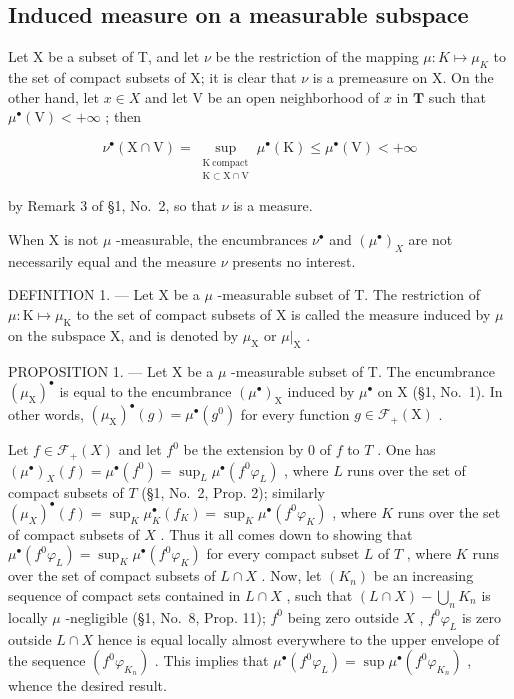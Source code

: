 \subsection{Induced measure on a measurable subspace}

Let X be a subset of T, and let \(\nu\) be the restriction of the mapping \(\mu: K \mapsto \mu_{K}\) to the set of compact subsets of X; it is clear that \(\nu\) is a premeasure on X. On the other hand, let \(x \in X\) and let V be an open neighborhood of \(x\) in \(\mathbf{T}\) such that \(\mu^{\bullet}(\mathrm{V}) < +\infty\) ; then

\[
\nu^{\bullet}(\mathrm{X}\cap \mathrm{V}) = \sup_{\substack{\mathrm{K\ compact}\\ \mathrm{K}\subset \mathrm{X}\cap \mathrm{V}}}\mu^{\bullet}(\mathrm{K})\leqslant \mu^{\bullet}(\mathrm{V}) <   + \infty
\]

by Remark 3 of §1, No.~2, so that \(\nu\) is a measure.

When X is not \(\mu\) -measurable, the encumbrances \(\nu^{\bullet}\) and \((\mu^{\bullet})_{X}\) are not necessarily equal and the measure \(\nu\) presents no interest.

DEFINITION 1. --- Let X be a \(\mu\) -measurable subset of T. The restriction of \(\mu: \mathrm{K} \mapsto \mu_{\mathrm{K}}\) to the set of compact subsets of X is called the measure induced by \(\mu\) on the subspace X, and is denoted by \(\mu_{\mathrm{X}}\) or \(\mu|_{\mathrm{X}}\) .

PROPOSITION 1. --- Let X be a \(\mu\) -measurable subset of T. The encumbrance \((\mu_{\mathrm{X}})^{\bullet}\) is equal to the encumbrance \((\mu^{\bullet})_{\mathrm{X}}\) induced by \(\mu^{\bullet}\) on X (§1, No.~1). In other words, \((\mu_{\mathrm{X}})^{\bullet}(g) = \mu^{\bullet}(g^{0})\) for every function \(g \in \mathcal{F}_{+}(\mathrm{X})\) .

Let \(f \in \mathcal{F}_{+}(X)\) and let \(f^{0}\) be the extension by 0 of \(f\) to \(T\) . One has \((\mu^{\bullet})_{X}(f) = \mu^{\bullet}(f^{0}) = \sup_{L} \mu^{\bullet}(f^{0}\varphi_{L})\) , where \(L\) runs over the set of compact subsets of \(T\) (§1, No.~2, Prop. 2); similarly \((\mu_{X})^{\bullet}(f) = \sup_{K} \mu_{K}^{\bullet}(f_{K}) = \sup_{K} \mu^{\bullet}(f^{0}\varphi_{K})\) , where \(K\) runs over the set of compact subsets of \(X\) . Thus it all comes down to showing that \(\mu^{\bullet}(f^{0}\varphi_{L}) = \sup_{K} \mu^{\bullet}(f^{0}\varphi_{K})\) for every compact subset \(L\) of \(T\) , where \(K\) runs over the set of compact subsets of \(L \cap X\) . Now, let \((K_{n})\) be an increasing sequence of compact sets contained in \(L \cap X\) , such that \((L \cap X) - \bigcup_{n} K_{n}\) is locally \(\mu\) -negligible (§1, No.~8, Prop. 11); \(f^{0}\) being zero outside \(X\) , \(f^{0}\varphi_{L}\) is zero outside \(L \cap X\) hence is equal locally almost everywhere to the upper envelope of the sequence \((f^{0}\varphi_{K_{n}})\) . This implies that \(\mu^{\bullet}(f^{0}\varphi_{L}) = \sup \mu^{\bullet}(f^{0}\varphi_{K_{n}})\) , whence the desired result.

